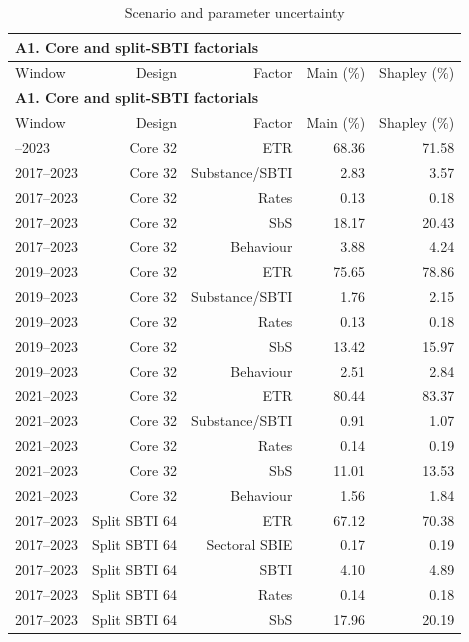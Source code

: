 {\small\setlength{\LTpre}{4pt}\setlength{\LTpost}{4pt}
\begin{longtable}{@{}lrrrr@{}}
\caption{Scenario and parameter uncertainty}\label{tab:tab_v2_factorial_globe_and_total_variance} \\
\multicolumn{5}{l}{\textbf{A1. Core and split-SBTI factorials}} \\
\toprule
Window & Design & Factor & Main (\%) & Shapley (\%) \\
\midrule
\endfirsthead
\multicolumn{5}{l}{\textbf{A1. Core and split-SBTI factorials}} \\
\toprule
Window & Design & Factor & Main (\%) & Shapley (\%) \\
\midrule
\endhead
\midrule
\endfoot
\bottomrule
\endlastfoot
2017–2023 & Core 32 & ETR & 68.36 & 71.58 \\
2017–2023 & Core 32 & Substance/SBTI &  2.83 &  3.57 \\
2017–2023 & Core 32 & Rates &  0.13 &  0.18 \\
2017–2023 & Core 32 & SbS & 18.17 & 20.43 \\
2017–2023 & Core 32 & Behaviour &  3.88 &  4.24 \\
2019–2023 & Core 32 & ETR & 75.65 & 78.86 \\
2019–2023 & Core 32 & Substance/SBTI &  1.76 &  2.15 \\
2019–2023 & Core 32 & Rates &  0.13 &  0.18 \\
2019–2023 & Core 32 & SbS & 13.42 & 15.97 \\
2019–2023 & Core 32 & Behaviour &  2.51 &  2.84 \\
2021–2023 & Core 32 & ETR & 80.44 & 83.37 \\
2021–2023 & Core 32 & Substance/SBTI &  0.91 &  1.07 \\
2021–2023 & Core 32 & Rates &  0.14 &  0.19 \\
2021–2023 & Core 32 & SbS & 11.01 & 13.53 \\
2021–2023 & Core 32 & Behaviour &  1.56 &  1.84 \\
2017–2023 & Split SBTI 64 & ETR & 67.12 & 70.38 \\
2017–2023 & Split SBTI 64 & Sectoral SBIE &  0.17 &  0.19 \\
2017–2023 & Split SBTI 64 & SBTI &  4.10 &  4.89 \\
2017–2023 & Split SBTI 64 & Rates &  0.14 &  0.18 \\
2017–2023 & Split SBTI 64 & SbS & 17.96 & 20.19 \\

\end{longtable}}
